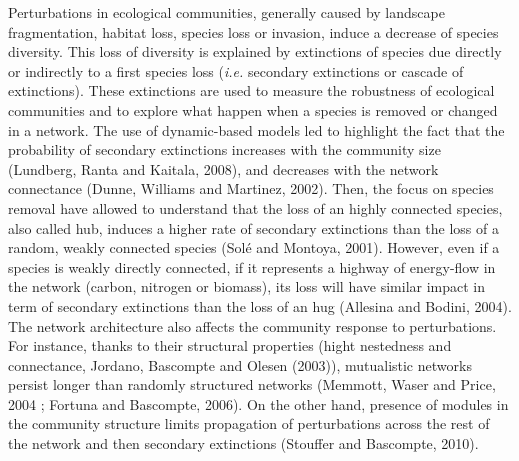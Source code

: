 \documentclass[12pt]{article}
\begin{document}
Perturbations in ecological communities, generally caused by landscape
fragmentation, habitat loss, species loss or invasion, induce a decrease
of species diversity. This loss of diversity is explained by extinctions
of species due directly or indirectly to a first species loss
(\emph{i.e.} secondary extinctions or cascade of extinctions). These
extinctions are used to measure the robustness of ecological communities
and to explore what happen when a species is removed or changed in a
network. The use of dynamic-based models led to highlight the fact that
the probability of secondary extinctions increases with the community
size (Lundberg, Ranta and Kaitala, 2008), and decreases with the network
connectance (Dunne, Williams and Martinez, 2002). Then, the focus on
species removal have allowed to understand that the loss of an highly
connected species, also called hub, induces a higher rate of secondary
extinctions than the loss of a random, weakly connected species (Solé
and Montoya, 2001). However, even if a species is weakly directly
connected, if it represents a highway of energy-flow in the network
(carbon, nitrogen or biomass), its loss will have similar impact in term
of secondary extinctions than the loss of an hug (Allesina and Bodini,
2004). The network architecture also affects the community response to
perturbations. For instance, thanks to their structural properties
(hight nestedness and connectance, Jordano, Bascompte and Olesen
(2003)), mutualistic networks persist longer than randomly structured
networks (Memmott, Waser and Price, 2004 ; Fortuna and Bascompte, 2006).
On the other hand, presence of modules in the community structure limits
propagation of perturbations across the rest of the network and then
secondary extinctions (Stouffer and Bascompte, 2010).
\end{document}

